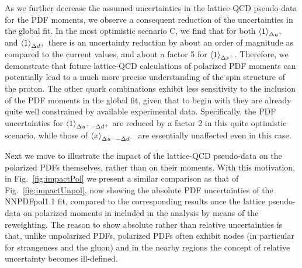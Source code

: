 As we further decrease the assumed uncertainties in the lattice-QCD pseudo-data
for the PDF moments, we observe a consequent reduction of the uncertainties
in the global fit.
%
In the most optimistic scenario C, we find that for both
$\left\langle 1\right\rangle_{\Delta u^+}$ and $\left\langle 1\right\rangle_{\Delta d^+}$ there is an uncertainty
reduction by about an order of magnitude as compared to the current values,
and about a factor 5 for $\left\langle 1\right\rangle_{\Delta s^+}$.
%
Therefore, we demonstrate that future lattice-QCD calculations of
polarized PDF moments can potentially lead to a much more
precise understanding of the spin structure of the proton.
%
The other quark combinations exhibit less sensitivity to the inclusion
of the PDF moments in the global fit, given that to begin with
they are already quite well constrained by available experimental
data.
%
Specifically, the PDF uncertainties for  $\left\langle 1\right\rangle_{\Delta u^+ - \Delta d^+}$
are reduced by a factor 2 in this quite optimistic scenario, while
those of $\left\langle x\right\rangle_{\Delta u^--\Delta d^-}$ are essentially unaffected even
in this case.

Next we move to illustrate the impact of the lattice-QCD pseudo-data
on the polarized PDFs themselves, rather than on their
moments.
%
With this motivation,
in Fig.~\ref{fig:impactPol} we present a 
similar comparison as that of Fig.~\ref{fig:impactUnpol}, now
  showing the absolute PDF uncertainties of the NNPDFpol1.1 fit,
  compared to the corresponding results once the lattice pseudo-data
  on polarized moments in included in the analysis by means of the
  reweighting.
  The reason to show absolute rather than relative uncertainties
  is that, unlike unpolarized PDFs, polarized PDFs often exhibit nodes
  (in particular for strangeness and the gluon) and in the nearby regions
  the concept of relative uncertainty becomes ill-defined.
  
